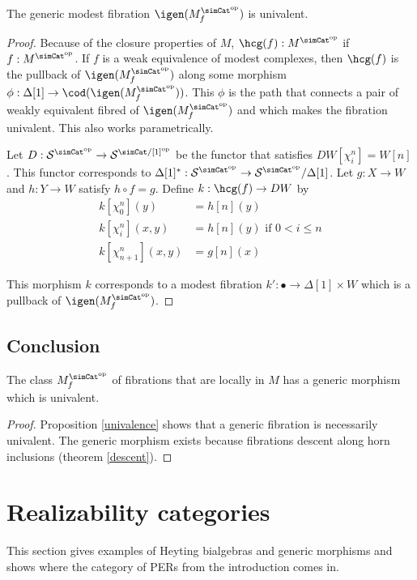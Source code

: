 \documentclass{tac}
\newcommand\hide[1]{}
\newcommand\cat\mathcal
\newcommand\ri{^*}
\newcommand\dual{^{\mathrm{op}}}
\newcommand\s{^{\simCat\dual}}
\newcommand\of{:}
\newcommand\simplex\Delta
\newcommand\f{_f}
\begin{document}
\begin{proposition} The generic modest fibration $\igen(M\s\f)$ is univalent. \label{univalence} \end{proposition}

\begin{proof} Because of the closure properties of $M$, $\hcg(f)\of M\s$ if $f\of M\s$. If $f$ is a weak equivalence of modest complexes, then $\hcg(f)$ is the pullback of $\igen(M\s\f)$ along some morphism $\phi\of\simplex[1]\to\cod(\igen(M\s\f))$. This $\phi$ is the path that connects a pair of weakly equivalent fibred of $\igen(M\s\f)$ and which makes the fibration univalent. This also works parametrically.

Let $D\of \cat S\s\to \cat S^{\simCat/[1]\dual}$ be the functor that satisfies $DW[\chi^n_i]=W[n]$. This functor corresponds to $\simplex[1]\ri\of \cat S\s\to \cat S\s/\simplex[1]$. Let $g\of X\to W$ and $h\of Y\to W$ satisfy $h\circ f=g$. Define $k\of\hcg(f) \to DW$ by
\begin{align*}
k[\chi^n_0](y) &= h[n](y)\\
k[\chi^n_i](x,y) &= h[n](y) \textrm{ if $0<i\leq n$}\\
k[\chi^n_{n+1}](x,y) &= g[n](x)
\end{align*}

This morphism $k$ corresponds to a modest fibration $k'\of\bullet\to \simplex[1]\times W$ which is a pullback of $\igen(M\s\f)$.
\end{proof}

\subsection{Conclusion}\hide{some text?}

\begin{theorem} The class $M\s\f$ of fibrations that are locally in $M$ has a generic morphism which is univalent. \label{univalent universe}\end{theorem} 

\begin{proof} Proposition \ref{univalence} shows that a generic fibration is necessarily univalent. The generic morphism exists because fibrations descent along horn inclusions (theorem \ref{descent}). \end{proof}

\section{Realizability categories}
This section gives examples of Heyting bialgebras and generic morphisms and shows where the category of PERs from the introduction comes in.
\end{document}
